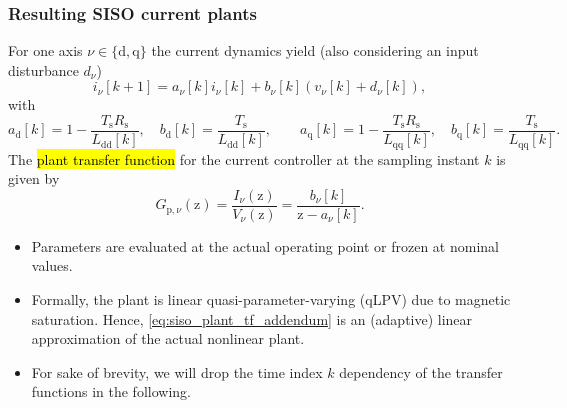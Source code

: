 \begin{frame}
    \frametitle{Resulting SISO current plants}
    For one axis $\nu\in\{\mathrm{d},\mathrm{q}\}$ the current dynamics yield (also considering an input disturbance $d_\nu$)
    \begin{equation}
        i_\nu[k+1]=a_\nu[k] i_\nu[k]+b_\nu[k]\left(v_\nu[k] + d_\nu[k]\right),
        \label{eq:siso_current_plant_addendum}
    \end{equation}\pause%
    with
    \begin{equation}
        a_\mathrm{d}[k]=1-\frac{T_\mathrm{s}R_\mathrm{s}}{L_\mathrm{dd}[k]},\quad
        b_\mathrm{d}[k]=\frac{T_\mathrm{s}}{L_\mathrm{dd}[k]},\qquad
        a_\mathrm{q}[k]=1-\frac{T_\mathrm{s}R_\mathrm{s}}{L_\mathrm{qq}[k]},\quad
        b_\mathrm{q}[k]=\frac{T_\mathrm{s}}{L_\mathrm{qq}[k]}.
    \end{equation}\pause%
    The \hl{plant transfer function} for the current controller at the sampling instant $k$ is given by
    \begin{equation}
        G_{\mathrm{p},\nu}(\mathrm{z})=\frac{I_\nu(\mathrm{z})}{V_\nu(\mathrm{z})}=\frac{b_\nu[k]}{\mathrm{z}-a_\nu[k]}.
        \label{eq:siso_plant_tf_addendum}
    \end{equation}\pause%
    \begin{itemize}
        \item Parameters are evaluated at the actual operating point or frozen at nominal values. \pause%
        \item Formally, the plant is linear quasi-parameter-varying (qLPV) due to magnetic saturation. Hence, \eqref{eq:siso_plant_tf_addendum} is an (adaptive) linear approximation of the actual nonlinear plant. \pause%
        \item For sake of brevity, we will drop the time index $k$ dependency of the transfer functions in the following.
    \end{itemize}
\end{frame}


